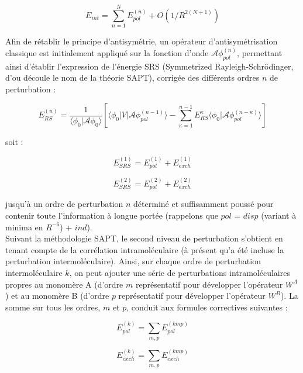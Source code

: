 \documentclass[12pt,a4paper]{book}
\begin{document}
	\begin{equation}
	E_{int} = \sum_{n=1}^{N} E_{pol}^{(n)} + O(1/R^{2 (N+1)})
	\end{equation}
	
	Afin de rétablir le principe d’antisymétrie, un opérateur d’antisymétrisation classique est initialement appliqué sur la fonction d’onde $\mathscr{A} \phi_{pol}^{(n)}$, permettant ainsi d’établir l’expression de l’énergie SRS (Symmetrized Rayleigh-Schr\"{o}dinger, d’ou découle le nom de la théorie SAPT), corrigée des différents ordres $n$ de perturbation :
	
	\begin{equation}
	E_{RS}^{(n)} = \frac{1}{\langle\phi_{0}|\mathscr{A}\phi_{0}\rangle} \left[\langle\phi_{0} | V| \mathscr{A} \phi_{pol}^{(n-1)}\rangle - \sum_{\kappa=1}^{n-1} E_{RS}^{\kappa} \langle \phi_{0}|\mathscr{A} \phi_{pol}^{(n-\kappa)}\rangle\right]
	\end{equation}
	
	soit :
	
	\begin{equation}
	E_{SRS}^{(1)} = E_{pol}^{(1)} + E_{exch}^{(1)}
	\end{equation}
	
	\begin{equation}
	E_{SRS}^{(2)} = E_{pol}^{(2)} + E_{exch}^{(2)}
	\end{equation}
	
	jusqu’à un ordre de perturbation $n$ déterminé et suffisamment poussé pour contenir toute l’information à longue portée (rappelons que $pol$ = $disp$ (variant à minima en $R^{-6}$) + $ind$).\\
	
	
	Suivant la méthodologie SAPT, le second niveau de perturbation s’obtient en tenant compte de la corrélation intramoléculaire (à présent qu'a été incluse la perturbation intermoléculaire). Ainsi, sur chaque ordre de perturbation intermoléculaire $k$, on peut ajouter une série de perturbations intramoléculaires propres au monomère A (d’ordre $m$ représentatif pour développer l’opérateur $W^{A}$) et au monomère B (d’ordre $p$ représentatif pour développer l’opérateur $W^{B}$). La somme sur tous les ordres, $m$ et $p$, conduit aux formules correctives suivantes :
	
	\begin{equation}
	E_{pol}^{(k)} = \sum_{m,p} E_{pol}^{(kmp)}
	\end{equation}
	
	\begin{equation}
	E_{exch}^{(k)} = \sum_{m,p} E_{exch}^{(kmp)}
	\end{equation}
	
\end{document}
